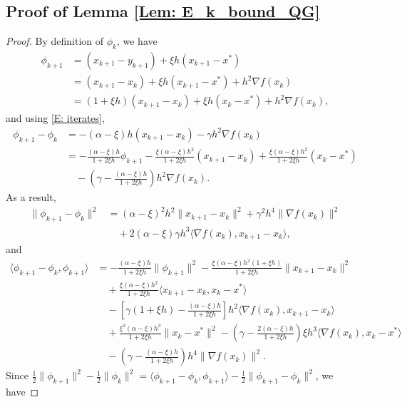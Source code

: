 \documentclass[pdflatex,sn-mathphys-num]{sn-jnl}
\theoremstyle{thmstyleone}
\theoremstyle{thmstyletwo}
\theoremstyle{thmstylethree}
\begin{document}
\begin{appendices}
\section{Proof of Lemma \ref{Lem: E_k_bound_QG}}
\label{Proof: Lem: E_k_bound_QG}

\begin{proof}
By definition of $\phi_k$, we have
\begin{align*}
\phi_{k+1} 
&= (x_{k+1}-y_{k+1}) + \xi h (x_{k+1}-x^*) \\
&= (x_{k+1}-x_k) + \xi h(x_{k+1}-x^*) + h^2 \nabla f(x_k)\\
&= (1+\xi h)(x_{k+1}-x_k)
  + \xi h(x_k-x^*) + h^2 \nabla f(x_k), 
\end{align*}
and using \eqref{E: iterates},
\begin{align*}
\phi_{k+1}-\phi_k
&= -(\alpha-\xi) h (x_{k+1}-x_k) - \gamma h^2 \nabla f(x_k) \\
&= - \frac{(\alpha-\xi) h}{1+2\xi h}\phi_{k+1}
   - \frac{\xi(\alpha-\xi)h^2}{1+2\xi h}(x_{k+1}-x_k)
   + \frac{\xi(\alpha-\xi)h^2}{1+2\xi h}(x_k-x^*) \\
&\quad -\left(\gamma - \frac{(\alpha-\xi) h}{1+2\xi h} \right) h^2 \nabla f(x_k).
\end{align*}
As a result,
\begin{align*}
\| \phi_{k+1}-\phi_k \|^2
&= (\alpha-\xi)^2 h^2\| x_{k+1}-x_k \|^2 
  + \gamma^2 h^4 \| \nabla f(x_k) \|^2 \\
&\quad + 2(\alpha-\xi)\gamma h^3 \langle \nabla f(x_k), x_{k+1} - x_k \rangle,
\end{align*}
and
\begin{align*}
\langle \phi_{k+1}-\phi_k, \phi_{k+1} \rangle
&= - \frac{(\alpha-\xi) h}{1+2\xi h} \| \phi_{k+1} \|^2
   - \frac{\xi(\alpha-\xi) h^2 (1+\xi h )}{1+2\xi h}\| x_{k+1}-x_k \|^2 \\
&\quad + \frac{\xi(\alpha-\xi) h^2}{1+2\xi h}\langle x_{k+1}-x_k, x_k - x^* \rangle \\ 
&\quad - \left[ \gamma (1+\xi h) - \frac{(\alpha-\xi) h}{1+2\xi h} \right] h^2 \langle \nabla f(x_k),x_{k+1}-x_k \rangle\\
&\quad + \frac{\xi^2(\alpha-\xi) h^3}{1+2\xi h}\| x_k - x^* \|^2 
   - \left(\gamma - \frac{2(\alpha-\xi) h}{1+2\xi h} \right) \xi h^3\langle \nabla f(x_k), x_k-x^* \rangle \\
&\quad -\left(\gamma - \frac{(\alpha-\xi) h}{1+2\xi h} \right) h^4 \| \nabla f(x_k) \|^2.
\end{align*}
Since $\frac{1}{2}\| \phi_{k+1} \|^2 - \frac{1}{2}\| \phi_k \|^2 = \langle \phi_{k+1}-\phi_k, \phi_{k+1} \rangle - \frac{1}{2}\| \phi_{k+1} - \phi_k \|^2$, we have

\end{proof}
\end{appendices}
\end{document}

